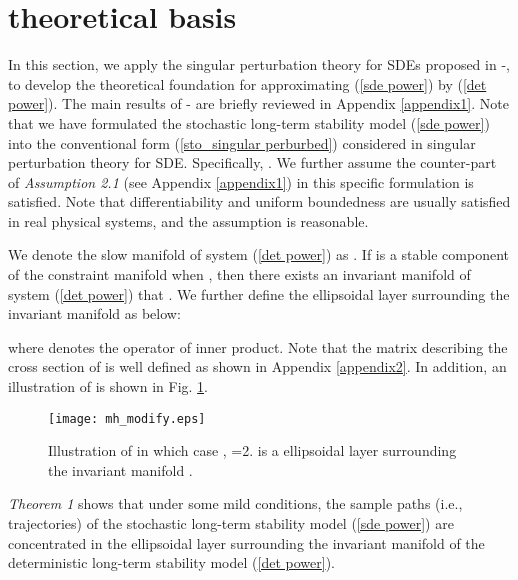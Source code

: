 \documentclass[journal]{IEEEtran}
\begin{document}
\section{theoretical basis}\label{sectiontheory}
In this section, we apply the singular perturbation theory for SDEs proposed in \cite{Gentz:2006}-\cite{Freidlin:book}, to develop the theoretical foundation for  approximating (\ref{sde power}) by (\ref{det power}). The main results of \cite{Gentz:2006}-\cite{Freidlin:book} are briefly reviewed in Appendix \ref{appendix1}. Note that we have formulated the stochastic long-term stability model (\ref{sde power}) into the conventional form (\ref{sto_singular perburbed}) considered in singular perturbation theory for SDE. Specifically, . We further assume the counter-part of \textit{Assumption 2.1} (see Appendix \ref{appendix1}) in this specific formulation is satisfied. Note that differentiability and uniform boundedness are usually satisfied in real physical systems, and the assumption is reasonable. 











We denote the slow manifold of system (\ref{det power}) as . If  is a stable component of the constraint manifold when , then there exists an invariant manifold of system (\ref{det power}) that . We further define the ellipsoidal layer  surrounding the invariant manifold as below:

where  denotes the operator of inner product. Note that the matrix  describing the cross section of  is well defined as shown in Appendix \ref{appendix2}. In addition, an illustration of  is shown in Fig. \ref{M(h)}. \begin{figure}[!ht]
\centering
\texttt{[image: mh\_modify.eps]}\caption{Illustration of  in which case , =2.  is a ellipsoidal layer surrounding the invariant manifold . }\label{M(h)}
\end{figure}

\textit{Theorem 1} shows that under some mild conditions,
the sample paths (i.e., trajectories) of the stochastic long-term stability model (\ref{sde power}) are concentrated in the ellipsoidal layer  surrounding the invariant manifold  of the deterministic long-term stability model (\ref{det power}).
\end{document}
